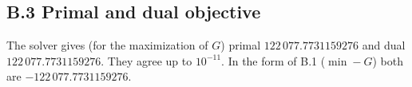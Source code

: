 \subsection*{B.3 \quad Primal and dual objective}

The solver gives (for the maximization of $G$) primal $122\,077.7731159276$ and dual $122\,077.7731159276$. They agree up to $10^{-11}$. In the form of B.1 ($\min -G$) both are $-122\,077.7731159276$.
